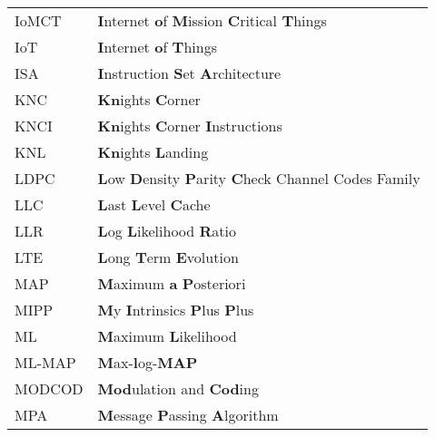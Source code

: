 \begin{center}
\begin{longtable}{ p{}  p{} }
		IoMCT   & \textbf{I}nternet \textbf{o}f \textbf{M}ission \textbf{C}ritical \textbf{T}hings                                \\
		IoT     & \textbf{I}nternet \textbf{o}f \textbf{T}hings                                                                   \\
		ISA     & \textbf{I}nstruction \textbf{S}et \textbf{A}rchitecture                                                         \\
		KNC     & \textbf{Kn}ights \textbf{C}orner                                                                                \\
		KNCI    & \textbf{Kn}ights \textbf{C}orner \textbf{I}nstructions                                                          \\
		KNL     & \textbf{Kn}ights \textbf{L}anding                                                                               \\
		LDPC    & \textbf{L}ow \textbf{D}ensity \textbf{P}arity \textbf{C}heck Channel Codes Family                               \\
		LLC     & \textbf{L}ast \textbf{L}evel \textbf{C}ache                                                                     \\
		LLR     & \textbf{L}og \textbf{L}ikelihood \textbf{R}atio                                                                 \\
		LTE     & \textbf{L}ong \textbf{T}erm \textbf{E}volution                                                                  \\
		MAP     & \textbf{M}aximum \textbf{a} \textbf{P}osteriori                                                                 \\
		MIPP    & \textbf{M}y \textbf{I}ntrinsics \textbf{P}lus \textbf{P}lus                                                     \\
		ML      & \textbf{M}aximum \textbf{L}ikelihood                                                                            \\
		ML-MAP  & \textbf{M}ax-\textbf{l}og-\textbf{MAP}                                                                          \\
		MODCOD  & \textbf{Mod}ulation and \textbf{Cod}ing                                                                         \\
		MPA     & \textbf{M}essage \textbf{P}assing \textbf{A}lgorithm                                                            \\

\end{longtable}
\end{center}
